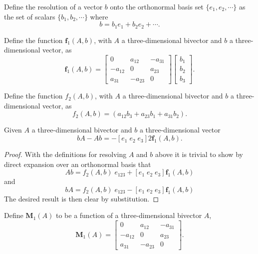 \begin{definition}
Define the resolution of a vector $b$ onto the orthonormal basis
set $\{e_{1}, e_{2}, \cdots\}$ as the set of scalars $\{b_{1}, b_{2}, \cdots\}$ where
\[b = b_1e_1 + b_2e_2 + \cdots.\]
\end{definition}

\begin{definition}
Define the function $\mathbf{f}_1(A,b)$,
       with $A$ a three-dimensional
bivector and $b$ a three-dimensional vector,
as
\[
\mathbf{f}_1(A,b) =
\left[ 
\begin{array}{ccc}
0 & a_{12} & - a_{31} \\
- a_{12} & 0 & a_{23}\\
a_{31} & - a_{23} & 0 
\end{array} 
\right]  
\left[ 
\begin{array}{c}
b_1 \\ b_2 \\ b_3
\end{array} 
\right].\]
\end{definition}

\begin{definition}
Define the function $f_2(A,b)$,
       with $A$ a three-dimensional
bivector and $b$ a three-dimensional vector,
       as
\[
f_2(A,b) = (a_{12}b_{3} + a_{23}b_1 + a_{31}b_2).
\]
\end{definition}

\begin{cor}
\label{lem:ABandBA}
Given  $A$ a three-dimensional
bivector and $b$ a three-dimensional vector
\[
bA - Ab = -
\left[ e_1 \; e_2 \; e_3 \right]
2\mathbf{f}_1(A,b).
\]
\begin{proof}
With the definitions for resolving $A$ and $b$ above it is trivial to show by direct expansion
over an orthonormal basis that
\[
Ab =
f_2(A,b)\;e_{123} +
\left[ e_1 \; e_2 \; e_3 \right]
 \mathbf{f}_1(A,b)
\]
and
\[
bA =
f_2(A,b)\;e_{123} - 
\left[ e_1 \; e_2 \; e_3 \right]
\mathbf{f}_1(A,b)
\]
The desired result is then clear by substitution.
\end{proof}
\end{cor}

\begin{definition}
Define $\mathbf{M}_1(A)$ to be a function of a three-dimensional bivector $A$,
\[
\mathbf{M}_1(A) = \left[ 
\begin{array}{ccc}
0 & a_{12} & - a_{31} \\
- a_{12} & 0 & a_{23}\\
a_{31} & - a_{23} & 0 
\end{array} 
\right].
\]
\end{definition}

